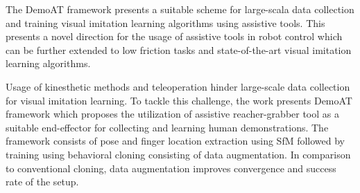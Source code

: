\documentclass[11pt,letterpaper]{article}
\begin{document}
The DemoAT framework presents a suitable scheme for large-scala data collection and training visual imitation learning algorithms using assistive tools. This presents a novel direction for the usage of assistive tools in robot control which can be further extended to low friction tasks and state-of-the-art visual imitation learning algorithms. 

Usage of kinesthetic methods and teleoperation hinder large-scale data collection for visual imitation learning. To tackle this challenge, the work presents DemoAT framework which proposes the utilization of assistive reacher-grabber tool as a suitable end-effector for collecting and learning human demonstrations. The framework consists of pose and finger location extraction using SfM followed by training using behavioral cloning consisting of data augmentation. In comparison to conventional cloning, data augmentation improves convergence and success rate of the setup. 
\end{document}
